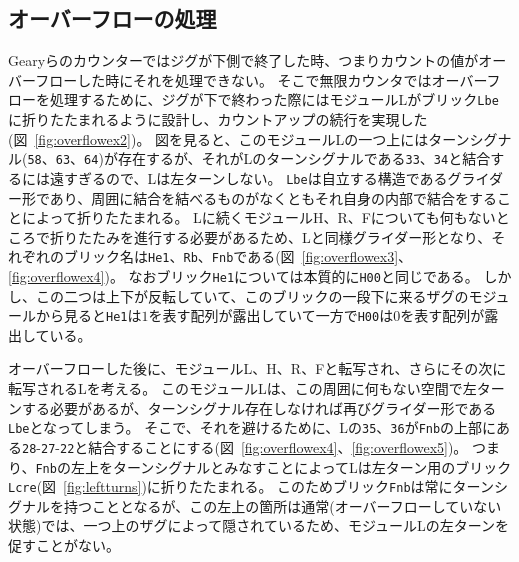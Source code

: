 \documentclass[a4,11pt]{article}
\begin{document}
\subsection{オーバーフローの処理}
Gearyらのカウンターではジグが下側で終了した時、つまりカウントの値がオーバーフローした時にそれを処理できない。
そこで無限カウンタではオーバーフローを処理するために、ジグが下で終わった際にはモジュールLがブリック\texttt{Lbe}に折りたたまれるように設計し、カウントアップの続行を実現した(図~\ref{fig:overflowex2})。
図を見ると、このモジュールLの一つ上にはターンシグナル(\texttt{58}、\texttt{63}、\texttt{64})が存在するが、それがLのターンシグナルである\texttt{33}、\texttt{34}と結合するには遠すぎるので、Lは左ターンしない。
\texttt{Lbe}は自立する構造であるグライダー形であり、周囲に結合を結べるものがなくともそれ自身の内部で結合をすることによって折りたたまれる。
Lに続くモジュールH、R、Fについても何もないところで折りたたみを進行する必要があるため、Lと同様グライダー形となり、それぞれのブリック名は\texttt{He1}、\texttt{Rb}、\texttt{Fnb}である(図~\ref{fig:overflowex3}、\ref{fig:overflowex4})。
なおブリック\texttt{He1}については本質的に\texttt{H00}と同じである。
しかし、この二つは上下が反転していて、このブリックの一段下に来るザグのモジュールから見ると\texttt{He1}は$1$を表す配列が露出していて一方で\texttt{H00}は$0$を表す配列が露出している。

オーバーフローした後に、モジュールL、H、R、Fと転写され、さらにその次に転写されるLを考える。
このモジュールLは、この周囲に何もない空間で左ターンする必要があるが、ターンシグナル存在しなければ再びグライダー形である\texttt{Lbe}となってしまう。
そこで、それを避けるために、Lの\texttt{35}、\texttt{36}が\texttt{Fnb}の上部にある\texttt{28}{-}\texttt{27}{-}\texttt{22}と結合することにする(図~\ref{fig:overflowex4}、\ref{fig:overflowex5})。
つまり、\texttt{Fnb}の左上をターンシグナルとみなすことによってLは左ターン用のブリック\texttt{Lcre}(図~\ref{fig:leftturns})に折りたたまれる。
このためブリック\texttt{Fnb}は常にターンシグナルを持つこととなるが、この左上の箇所は通常(オーバーフローしていない状態)では、一つ上のザグによって隠されているため、モジュールLの左ターンを促すことがない。
\end{document}

